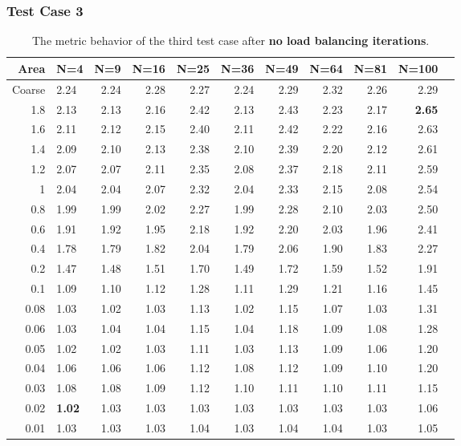 \documentclass[]{beamer}
\begin{document}
\begin{frame}[t]\frametitle{Test Case 3}
\begin{table}[H]
\tiny
\centering
\caption{The metric behavior of the third test case after\textbf{ no load balancing iterations}.} 
\begin{tabular}{rlrrrrrrrrr}
  \hline
 Area & N=4 & N=9 & N=16 & N=25 & N=36 & N=49 & N=64 & N=81 & N=100 \\ 
  \hline
 Coarse & 2.24 & 2.24 & 2.28 & 2.27 & 2.24 & 2.29 & 2.32 & 2.26 & 2.29 \\ 
 1.8 & 2.13 & 2.13 & 2.16 & 2.42 & 2.13 & 2.43 & 2.23 & 2.17 & \textbf{\cellcolor{blue!25}2.65} \\ 
   1.6 & 2.11 & 2.12 & 2.15 & 2.40 & 2.11 & 2.42 & 2.22 & 2.16 & 2.63 \\ 
   1.4 & 2.09 & 2.10 & 2.13 & 2.38 & 2.10 & 2.39 & 2.20 & 2.12 & 2.61 \\ 
 1.2 & 2.07 & 2.07 & 2.11 & 2.35 & 2.08 & 2.37 & 2.18 & 2.11 & 2.59 \\ 
 1 & 2.04 & 2.04 & 2.07 & 2.32 & 2.04 & 2.33 & 2.15 & 2.08 & 2.54 \\ 
 0.8 & 1.99 & 1.99 & 2.02 & 2.27 & 1.99 & 2.28 & 2.10 & 2.03 & 2.50 \\ 
0.6 & 1.91 & 1.92 & 1.95 & 2.18 & 1.92 & 2.20 & 2.03 & 1.96 & 2.41 \\ 
 0.4 & 1.78 & 1.79 & 1.82 & 2.04 & 1.79 & 2.06 & 1.90 & 1.83 & 2.27 \\ 
 0.2 & 1.47 & 1.48 & 1.51 & 1.70 & 1.49 & 1.72 & 1.59 & 1.52 & 1.91 \\ 
   0.1 & 1.09 & 1.10 & 1.12 & 1.28 & 1.11 & 1.29 & 1.21 & 1.16 & 1.45 \\ 
 0.08 & 1.03 & 1.02 & 1.03 & 1.13 & 1.02 & 1.15 & 1.07 & 1.03 & 1.31 \\ 
 0.06 & 1.03 & 1.04 & 1.04 & 1.15 & 1.04 & 1.18 & 1.09 & 1.08 & 1.28 \\ 
0.05 & 1.02 & 1.02 & 1.03 & 1.11 & 1.03 & 1.13 & 1.09 & 1.06 & 1.20 \\ 
 0.04 & 1.06 & 1.06 & 1.06 & 1.12 & 1.08 & 1.12 & 1.09 & 1.10 & 1.20 \\ 
  0.03 & 1.08 & 1.08 & 1.09 & 1.12 & 1.10 & 1.11 & 1.10 & 1.11 & 1.15 \\ 
  0.02 & \textbf{\cellcolor{blue!25}1.02} & 1.03 & 1.03 & 1.03 & 1.03 & 1.03 & 1.03 & 1.03 & 1.06 \\ 
 0.01 & 1.03 & 1.03 & 1.03 & 1.04 & 1.03 & 1.04 & 1.04 & 1.03 & 1.05 \\ 
   \hline
\end{tabular}
\end{table}
\end{frame}
\end{document}
